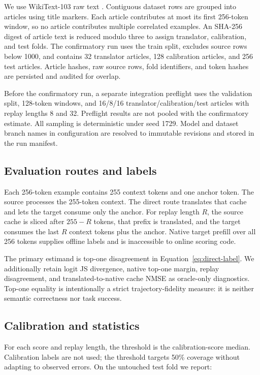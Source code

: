\documentclass[10pt,twocolumn]{article}
\begin{document}
We use WikiText-103 raw text \citep{merity2017pointer}.  Contiguous dataset rows
are grouped into articles using title markers.  Each article contributes at
most its first 256-token window, so no article contributes multiple correlated
examples.  An SHA-256 digest of article text is reduced modulo three to assign
translator, calibration, and test folds.  The confirmatory run uses the train
split, excludes source rows below 1000, and contains 32 translator articles,
128 calibration articles, and 256 test articles.  Article hashes, raw source
rows, fold identifiers, and token hashes are persisted and audited for
overlap.

Before the confirmatory run, a separate integration preflight uses the
validation split, 128-token windows, and 16/8/16 translator/calibration/test
articles with replay lengths 8 and 32.  Preflight results are not pooled with
the confirmatory estimate.  All sampling is deterministic under seed 1729.
Model and dataset branch names in configuration are resolved to immutable
revisions and stored in the run manifest.

\subsection{Evaluation routes and labels}

Each 256-token example contains 255 context tokens and one anchor token.  The
source processes the 255-token context.  The direct route translates that
cache and lets the target consume only the anchor.  For replay length $R$, the
source cache is sliced after $255-R$ tokens, that prefix is translated, and the
target consumes the last $R$ context tokens plus the anchor.  Native target
prefill over all 256 tokens supplies offline labels and is inaccessible to
online scoring code.

The primary estimand is top-one disagreement in
Equation~\ref{eq:direct-label}.  We additionally retain logit JS divergence,
native top-one margin, replay disagreement, and translated-to-native cache
NMSE as oracle-only diagnostics.  Top-one equality is intentionally a strict
trajectory-fidelity measure: it is neither semantic correctness nor task
success.

\subsection{Calibration and statistics}

For each score and replay length, the threshold is the calibration-score
median.  Calibration labels are not used; the threshold targets 50\% coverage
without adapting to observed errors.  On the untouched test fold we report:
\end{document}
